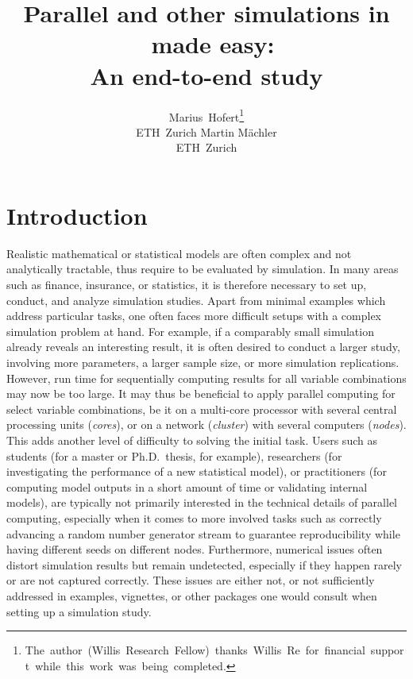 \documentclass[article]{jss}
\author{Marius\ Hofert\thanks{The\ author\ (Willis\ Research\ Fellow)\ thanks\
    Willis\ Re\ for\ financial\ support\ while\ this\ work\ was\ being\
    completed.}\\ ETH\ Zurich \And Martin M\"achler\\ ETH\ Zurich}
\title{Parallel and other simulations in \R\ made easy:\\ An end-to-end study}
\newif\ifMM
\theoremstyle{mythmstyle}%
\begin{document}
\ifMM\else%
\setvruler[10pt][1][1][4][1][0pt][0pt][0pt][\textheight]%
\fi

\section{Introduction}
Realistic mathematical or statistical models are often complex and not analytically
tractable, thus require to be evaluated by simulation. In many areas such as
finance, insurance, or statistics, it is therefore necessary to set up, conduct,
and analyze simulation studies. Apart from minimal examples which address
particular tasks, one often faces more difficult setups with a complex
simulation problem at hand. For example, if a comparably small simulation
already reveals an interesting result, it is often desired to conduct a larger
study, involving more parameters, a larger sample size, or more simulation
replications. However, run time for sequentially computing results for all
variable combinations may now be too large. It may thus be beneficial to apply parallel
computing for select variable combinations, be it on a multi-core processor with
several central processing units (\emph{cores}), or on a network (\emph{cluster}) with
several computers (\emph{nodes}). This adds another level of
difficulty to solving the initial task. Users such as students (for a master or
Ph.D.\ thesis, for example), researchers (for investigating the performance of a
new statistical model), or practitioners (for computing model outputs in a short
amount of time or validating internal models), are typically not primarily interested in the technical details
of parallel computing, especially when it comes to more involved tasks such as
correctly advancing a random number generator stream to guarantee
reproducibility while having different seeds on different nodes. Furthermore,
numerical issues often distort simulation results but remain undetected,
especially if they happen rarely or are not captured correctly. These issues are
either not, or not sufficiently addressed in examples, vignettes, or other
packages one would consult when setting up a simulation study.
\end{document}
